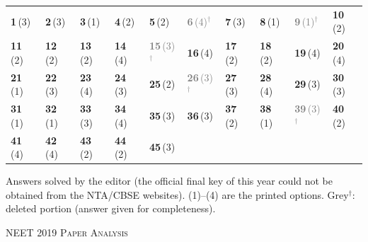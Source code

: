 {\small\setlength{\tabcolsep}{1pt}\renewcommand{\arraystretch}{1.5}
\begin{tabularx}{\linewidth}{@{}*{10}{>{\centering\arraybackslash}X}@{}}\toprule
\textbf{1}\,(3) & \textbf{2}\,(3) & \textbf{3}\,(1) & \textbf{4}\,(2) & \textbf{5}\,(2) & \textcolor{gray}{\textbf{6}\,(4)$^{\dagger}$} & \textbf{7}\,(3) & \textbf{8}\,(1) & \textcolor{gray}{\textbf{9}\,(1)$^{\dagger}$} & \textbf{10}\,(2)\\
\textbf{11}\,(2) & \textbf{12}\,(2) & \textbf{13}\,(2) & \textbf{14}\,(4) & \textcolor{gray}{\textbf{15}\,(3)$^{\dagger}$} & \textbf{16}\,(4) & \textbf{17}\,(2) & \textbf{18}\,(2) & \textbf{19}\,(4) & \textbf{20}\,(4)\\
\textbf{21}\,(1) & \textbf{22}\,(3) & \textbf{23}\,(4) & \textbf{24}\,(3) & \textbf{25}\,(2) & \textcolor{gray}{\textbf{26}\,(3)$^{\dagger}$} & \textbf{27}\,(3) & \textbf{28}\,(4) & \textbf{29}\,(3) & \textbf{30}\,(3)\\
\textbf{31}\,(1) & \textbf{32}\,(1) & \textbf{33}\,(3) & \textbf{34}\,(4) & \textbf{35}\,(3) & \textbf{36}\,(3) & \textbf{37}\,(2) & \textbf{38}\,(1) & \textcolor{gray}{\textbf{39}\,(3)$^{\dagger}$} & \textbf{40}\,(2)\\
\textbf{41}\,(4) & \textbf{42}\,(4) & \textbf{43}\,(2) & \textbf{44}\,(2) & \textbf{45}\,(3) &  &  &  &  & \\\bottomrule\end{tabularx}}\par\smallskip
{\footnotesize Answers solved by the editor (the official final key of this year could not be obtained from the NTA/CBSE websites). (1)--(4) are the printed options. {\color{gray}Grey$^{\dagger}$}: deleted portion (answer given for completeness).\par
}\par
\clearpage
\begin{center}{}\par
{\fontsize{20}{24}\selectfont\color{navy}\scshape NEET 2019 \textperiodcentered{} Paper Analysis}\par
{\color{gilt}}\end{center}
\vspace{4pt}
